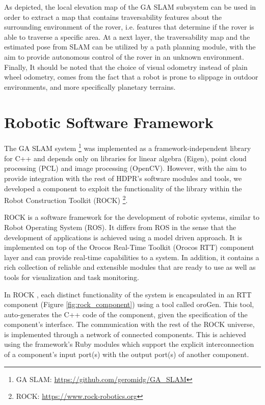 As depicted, the local elevation map of the GA SLAM subsystem can be used
in order to extract a map that contains traversability features about the
surrounding environment of the rover, i.e. features that determine if
the rover is able to traverse a specific area.
At a next layer, the traversability map and the estimated pose from SLAM
can be utilized by a path planning module, with the aim to provide
autonomous control of the rover in an unknown environment.
Finally, It should be noted that the choice of visual odometry
instead of plain wheel odometry, comes from the fact that a robot is prone
to slippage in outdoor environments, and more specifically planetary terrains.

\section{Robotic Software Framework}

The GA SLAM system \footnote{GA SLAM: \url{https://github.com/geromidg/GA_SLAM}}
was implemented as a framework-independent library for C++ and depends only
on libraries for linear algebra (Eigen), point cloud processing (PCL)
and image processing (OpenCV).
However, with the aim to provide integration with the rest of HDPR's
software modules and tools, we developed a component to exploit the
functionality of the library within the Robot Construction Toolkit (ROCK)
\footnote{ROCK: \url{https://www.rock-robotics.org}}.

ROCK is a software framework for the development of robotic systems,
similar to Robot Operating System (ROS).
It differs from ROS in the sense that the development of applications
is achieved using a model driven approach.
It is implemented on top of the Orocos Real-Time Toolkit (Orocos RTT)
component layer and can provide real-time capabilities to a system.
In addition, it contains a rich collection of reliable and extensible
modules that are ready to use as well as tools for visualization and
task monitoring.

In ROCK \parencite{Joyeux2011}, each distinct functionality of the system is
encapsulated in an RTT component (Figure \ref{fig:rock_component}) using a
tool called oroGen.
This tool, auto-generates the C++ code of the component, given
the specification of the component's interface.
The communication with the rest of the ROCK universe, is implemented through
a network of connected components.
This is achieved using the framework's Ruby modules which support the explicit
interconnection of a component's input port(s) with the output port(s)
of another component.

